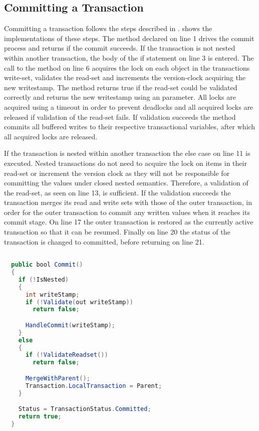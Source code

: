 \subsection{Committing a Transaction}
Committing a transaction follows the steps described in .  shows the implementations of these steps. The  method declared on line 1 drives the commit process and returns  if the commit succeeds. If the transaction is not nested within another transaction, the body of the if statement on line 3 is entered. The call to the  method on line 6 acquires the lock on each object in the transactions write-set, validates the read-set and increments the version-clock acquiring the new writestamp. The  method returns true if the read-set could be validated correctly and returns the new writestamp using an  parameter. All locks are acquired using a timeout in order to prevent deadlocks and all acquired locks are released if validation of the read-set fails. If validation succeeds the  method commits all buffered writes to their respective transactional variables, after which all acquired locks are released. 

If the transaction is nested within another transaction the else case on line 11 is executed. Nested transactions do not need to acquire the lock on items in their read-set or increment the version clock as they will not be responsible for committing the values under closed nested semantics. Therefore, a validation of the read-set, as seen on line 13, is sufficient. If the validation succeeds the transaction merges its read and write sets with those of the outer transaction, in order for the outer transaction to commit any written values when it reaches its commit stage. On line 17 the outer transaction is restored as the currently active transaction so that it can be resumed. Finally on line 20 the status of the transaction is changed to committed, before returning on line 21.


\begin{lstlisting}[float, label=lst:library_commit,
  caption={Committing a Transaction},
  language=Java,  
  showspaces=false,
  showtabs=false,
  breaklines=true,
  showstringspaces=false,
  breakatwhitespace=true,
  commentstyle=\color{greencomments},
  keywordstyle=\color{bluekeywords},
  stringstyle=\color{redstrings},
  morekeywords={atomic, retry, orElse, var, get, set, bool}]  % Start your code-block
  
  public bool Commit()
  {
    if (!IsNested)
    {
      int writeStamp;
      if (!Validate(out writeStamp))
        return false;

      HandleCommit(writeStamp);
    }
    else
    {
      if (!ValidateReadset())
        return false;

      MergeWithParent();
      Transaction.LocalTransaction = Parent;
    }

    Status = TransactionStatus.Committed;
    return true;
  }
\end{lstlisting}

